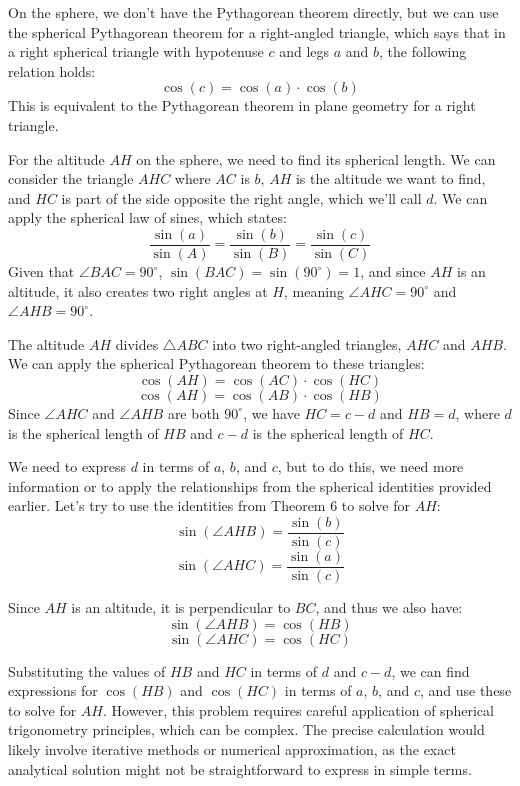 \documentclass[letter,12pt]{article}
\begin{document}
On the sphere, we don't have the Pythagorean theorem directly, but we can use the spherical Pythagorean theorem for a right-angled triangle, which says that in a right spherical triangle with hypotenuse $c$ and legs $a$ and $b$, the following relation holds:
$$ \cos(c) = \cos(a) \cdot \cos(b) $$
This is equivalent to the Pythagorean theorem in plane geometry for a right triangle.

For the altitude $AH$ on the sphere, we need to find its spherical length. We can consider the triangle $AHC$ where $AC$ is $b$, $AH$ is the altitude we want to find, and $HC$ is part of the side opposite the right angle, which we'll call $d$. We can apply the spherical law of sines, which states:
$$ \frac{\sin(a)}{\sin(A)} = \frac{\sin(b)}{\sin(B)} = \frac{\sin(c)}{\sin(C)} $$
Given that $\angle BAC = 90^\circ$, $\sin(BAC) = \sin(90^\circ) = 1$, and since $AH$ is an altitude, it also creates two right angles at $H$, meaning $\angle AHC = 90^\circ$ and $\angle AHB = 90^\circ$. 

The altitude $AH$ divides $\triangle ABC$ into two right-angled triangles, $AHC$ and $AHB$. We can apply the spherical Pythagorean theorem to these triangles:
$$ \cos(AH) = \cos(AC) \cdot \cos(HC) $$
$$ \cos(AH) = \cos(AB) \cdot \cos(HB) $$
Since $\angle AHC$ and $\angle AHB$ are both $90^\circ$, we have $HC = c - d$ and $HB = d$, where $d$ is the spherical length of $HB$ and $c - d$ is the spherical length of $HC$. 

We need to express $d$ in terms of $a$, $b$, and $c$, but to do this, we need more information or to apply the relationships from the spherical identities provided earlier. Let's try to use the identities from Theorem 6 to solve for $AH$:
$$ \sin(\angle AHB) = \frac{\sin(b)}{\sin(c)} $$
$$ \sin(\angle AHC) = \frac{\sin(a)}{\sin(c)} $$

Since $AH$ is an altitude, it is perpendicular to $BC$, and thus we also have:
$$ \sin(\angle AHB) = \cos(HB) $$
$$ \sin(\angle AHC) = \cos(HC) $$

Substituting the values of $HB$ and $HC$ in terms of $d$ and $c - d$, we can find expressions for $\cos(HB)$ and $\cos(HC)$ in terms of $a$, $b$, and $c$, and use these to solve for $AH$. However, this problem requires careful application of spherical trigonometry principles, which can be complex. The precise calculation would likely involve iterative methods or numerical approximation, as the exact analytical solution might not be straightforward to express in simple terms.

\pagebreak
\end{document}
